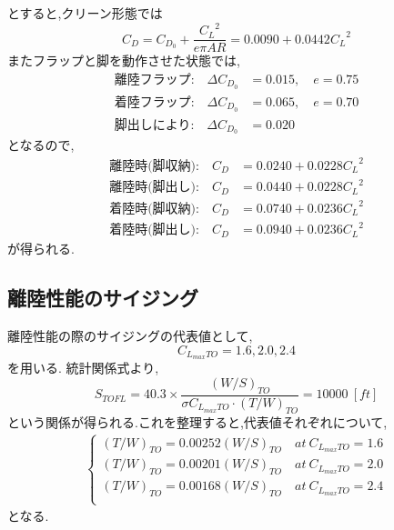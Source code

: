 \documentclass[../main]{subfiles}
\begin{document}
    とすると,クリーン形態では
    \begin{equation}
      C_D = C_{D_0} + \frac{{C_L}^2}{e \pi AR} = 0.0090 + 0.0442 {C_L}^2
    \end{equation}
    またフラップと脚を動作させた状態では,
    \begin{align}
      \text{離陸フラップ:} \quad \Delta C_{D_0} &= 0.015, \quad e=0.75  \\
      \text{着陸フラップ:} \quad \Delta C_{D_0} &= 0.065, \quad e=0.70  \\
      \text{脚出しにより:} \quad \Delta C_{D_0} &= 0.020
    \end{align}
    となるので,
    \begin{align}
      \text{離陸時(脚収納):} \quad C_D &= 0.0240 + 0.0228 {C_L}^2 \\
      \text{離陸時(脚出し):} \quad C_D &= 0.0440 + 0.0228 {C_L}^2 \\
      \text{着陸時(脚収納):} \quad C_D &= 0.0740 + 0.0236 {C_L}^2 \\
      \text{着陸時(脚出し):} \quad C_D &= 0.0940 + 0.0236 {C_L}^2
    \end{align}
    が得られる.

  \subsection{離陸性能のサイジング}
    離陸性能の際のサイジングの代表値として,
    \begin{equation}
      C_{L_{max}TO} = 1.6,2.0,2.4
    \end{equation}
    を用いる.
    統計関係式より,
    \begin{equation}
      S_{TOFL} = 40.3 \times \dfrac{(W/S)_{TO}}{\sigma C_{L_{max}TO} \cdot (T/W)_{TO}} = 10000 \ [ft]
    \end{equation}
    という関係が得られる.これを整理すると,代表値それぞれについて,
    \begin{eqnarray}
      \begin{cases}
        (T/W)_{TO} = 0.00252 (W/S)_{TO} \quad at \ C_{L_{max}TO} = 1.6 \\[3mm]
        (T/W)_{TO} = 0.00201 (W/S)_{TO} \quad at \ C_{L_{max}TO} = 2.0 \\[3mm]
        (T/W)_{TO} = 0.00168 (W/S)_{TO} \quad at \ C_{L_{max}TO} = 2.4 \\[3mm]
      \end{cases}
    \end{eqnarray}
    となる.
\end{document}

